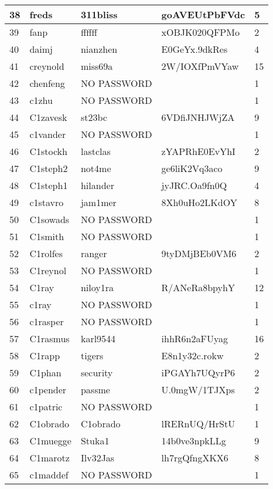 \documentclass[11pt]{article} %
\begin{document}
\newpage
\begin{tabular}{|p{0.5cm}|p{3.1cm}|p{3.1cm}|p{3.3cm}|p{1.7cm}|}
\hline
38 & freds & 311bliss & goAVEUtPbFVdc & 5\\ \hline
39 & fanp & ffffff & xOBJK020QFPMo & 2\\ \hline
40 & daimj & nianzhen & E0GeYx.9dkRes & 4 \\ \hline
41 & creynold & miss69a & 2W/IOXfPmVYaw & 15 \\ \hline
42 & chenfeng & NO PASSWORD & & 1\\ \hline
43 & c1zhu & NO PASSWORD & & 1\\ \hline
44 & C1zavesk & st23bc & 6VDfiJNHJWjZA & 9 \\ \hline
45 & c1vander & NO PASSWORD & & 1\\ \hline
46 & C1stockh & lastclas	& zYAPRhE0EvYhI & 2\\ \hline
47 & C1steph2 & not4me	 & ge6liK2Vq3aco & 9 \\ \hline
48 & C1steph1 & hilander & jyJRC.Oa9fn0Q & 4 \\ \hline
49 & c1stavro & jam1mer & 8Xh0uHo2LKdOY & 8\\ \hline
50 & C1sowads & NO PASSWORD & & 1\\ \hline
51 & C1smith & NO PASSWORD	& & 1\\ \hline
52 & C1rolfes & ranger & 9tyDMjBEb0VM6 & 2\\ \hline
53 & C1reynol & NO PASSWORD & & 1\\ \hline
54 & C1ray & niloy1ra & R/ANeRa8bpyhY & 12 \\ \hline
55 & c1ray	& NO PASSWORD &	 & 1\\ \hline
56 & c1rasper & NO PASSWORD & & 1\\ \hline
57 & C1rasmus & karl9544 & ihhR6n2aFUyag & 16 \\ \hline
58 & C1rapp & tigers & E8n1y32c.rokw & 2\\ \hline
59 & C1phan & security & iPGAYh7UQyrP6 & 2\\ \hline
60 & c1pender & passme	& U.0mgW/1TJXps & 2\\ \hline
61 & c1patric & NO PASSWORD & & 1\\ \hline
62 & C1obrado & C1obrado & lRERnUQ/HrStU & 1\\ \hline
63 & C1muegge & Stuka1 & 14b0ve3npkLLg & 9 \\ \hline
64 & C1marotz & Ilv32Jas & lh7rgQfngXKX6 & 8\\ \hline
65 & c1maddef & NO PASSWORD & & 1\\ \hline

\end{tabular}
\end{document}
